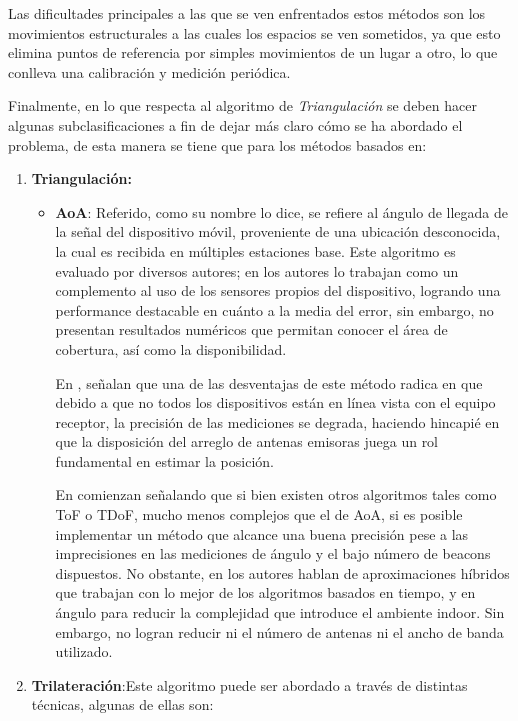 Las dificultades principales a las que se ven enfrentados estos métodos son los movimientos estructurales a las cuales los espacios se ven sometidos, ya que esto elimina puntos de referencia por simples movimientos de un lugar a otro, lo que conlleva una calibración y medición periódica.\cite{20}

Finalmente, en lo que respecta al algoritmo de \textit{Triangulación} se deben hacer algunas subclasificaciones a fin de dejar más claro cómo se ha abordado el problema, de esta manera se tiene que para los métodos basados en:

\begin{enumerate}
\item{\textbf{Triangulación:}
    \begin{itemize}
        \item{\textbf{\ac{AoA}}: Referido, como su nombre lo dice, se refiere al ángulo de llegada de la señal del dispositivo móvil, proveniente de una ubicación desconocida, la cual es recibida en múltiples estaciones base. Este algoritmo es evaluado por diversos autores; en \cite{1} los autores lo trabajan como un complemento al uso de los sensores propios del dispositivo, logrando una performance destacable en cuánto a la media del error, sin embargo, no presentan resultados numéricos que permitan conocer el área de cobertura, así como la disponibilidad.
            
        En \cite{20}, señalan que una de las desventajas de este método radica en que debido a que no todos los dispositivos están en línea vista con el equipo receptor, la precisión de las mediciones se degrada, haciendo hincapié en que la disposición del arreglo de antenas emisoras juega un rol fundamental en estimar la posición.
            
        En \cite{21} comienzan señalando que si bien existen otros algoritmos tales como ToF o TDoF, mucho menos complejos que el de AoA, si es posible implementar un método que alcance una buena precisión pese a las imprecisiones en las mediciones de ángulo y el bajo número de beacons dispuestos. No obstante, en \cite{5} los autores hablan de aproximaciones  híbridos que trabajan con lo mejor de los algoritmos basados en tiempo, y en ángulo para reducir la complejidad que introduce el ambiente indoor. Sin embargo, no logran reducir ni el número de antenas ni el ancho de banda utilizado.}
        \end{itemize}
        }
\item{\textbf{Trilateración}:Este algoritmo puede ser abordado a través de distintas técnicas, algunas de ellas son:
        
}
\end{enumerate}
